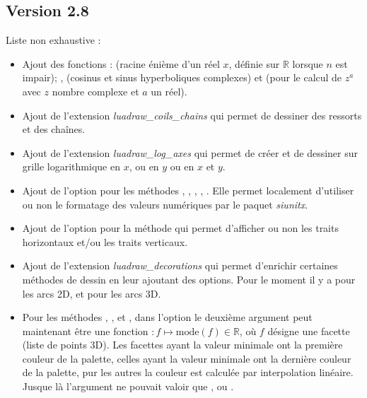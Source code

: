 \subsection{Version 2.8}
Liste non exhaustive :
\begin{itemize}
    \item Ajout des fonctions :  (racine énième d'un réel $x$, définie sur $\mathbb R$ lorsque $n$ est impair); ,  (cosinus et sinus hyperboliques complexes) et  (pour le calcul de $z^a$ avec $z$ nombre complexe et $a$ un réel).
    
    \item Ajout de l'extension \emph{luadraw\_coils\_chains} qui permet de dessiner des ressorts et des chaînes.

    \item Ajout de l'extension \emph{luadraw\_log\_axes} qui permet de créer et de dessiner sur grille logarithmique en $x$, ou en $y$ ou en $x$ et $y$.

    \item Ajout de l'option  pour les méthodes , , , , . Elle permet localement d'utiliser ou non le formatage des valeurs numériques par le paquet \emph{siunitx}.
    
    \item Ajout de l'option  pour la méthode  qui permet d'afficher ou non les traits horizontaux et/ou les traits verticaux.
    
    \item Ajout de l'extension \emph{luadraw\_decorations} qui permet d'enrichir certaines méthodes de dessin en leur ajoutant des options. Pour le moment il y a  pour les arcs 2D, et  pour les arcs 3D.
    
    \item Pour les méthodes , ,  et , dans l'option  le deuxième argument peut maintenant être une fonction $\colon f \mapsto \mathrm{mode}(f)\in\mathbb R$, où $f$ désigne une facette (liste de points 3D). Les facettes ayant la valeur minimale ont la première couleur de la palette, celles ayant la valeur minimale ont la dernière couleur de la palette, pur les autres la couleur est calculée par interpolation linéaire. Jusque là l'argument  ne pouvait valoir que ,  ou .
    

\end{itemize}
